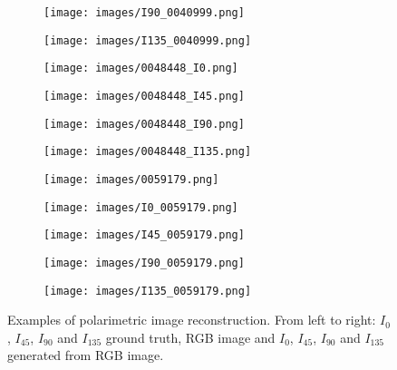 \begin{figure}
	\begin{subfigure}{.105\textwidth}
		\centering
		\texttt{[image: images/I90\_0040999.png]}
	\end{subfigure}%
	\begin{subfigure}{.105\textwidth}
		\centering
		\texttt{[image: images/I135\_0040999.png]}
	\end{subfigure}
	\begin{subfigure}{.11\textwidth}
		\centering
		\texttt{[image: images/0048448\_I0.png]}
	\end{subfigure}%
	\begin{subfigure}{.11\textwidth}
		\centering
		\texttt{[image: images/0048448\_I45.png]}
	\end{subfigure}%
	\begin{subfigure}{.11\textwidth}
		\centering
		\texttt{[image: images/0048448\_I90.png]}
	\end{subfigure}%
	\begin{subfigure}{.11\textwidth}
		\centering
		\texttt{[image: images/0048448\_I135.png]}
	\end{subfigure}%
	\begin{subfigure}{.105\textwidth}
		\centering
		\texttt{[image: images/0059179.png]}
	\end{subfigure}%
	\begin{subfigure}{.105\textwidth}
		\centering
		\texttt{[image: images/I0\_0059179.png]}
	\end{subfigure}%
	\begin{subfigure}{.105\textwidth}
		\centering
		\texttt{[image: images/I45\_0059179.png]}
	\end{subfigure}%
	\begin{subfigure}{.105\textwidth}
		\centering
		\texttt{[image: images/I90\_0059179.png]}
	\end{subfigure}%
	\begin{subfigure}{.105\textwidth}
		\centering
		\texttt{[image: images/I135\_0059179.png]}
	\end{subfigure}
	\caption{Examples  of polarimetric image reconstruction. From left to right: $I_0$, $I_{45}$, $I_{90}$ and $I_{135}$ ground truth, RGB image and $I_0$, $I_{45}$, $I_{90}$ and $I_{135}$ generated from RGB image.}
	\label{fig:reco_polar}
\end{figure}


